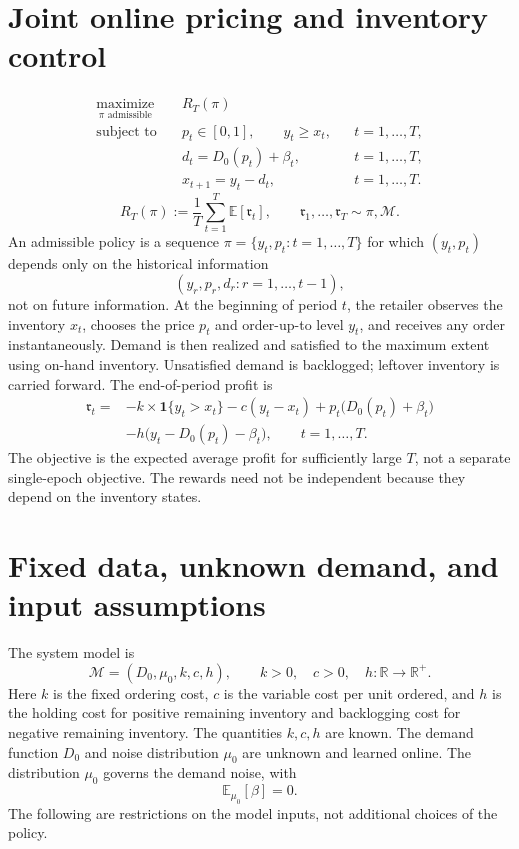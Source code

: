 \documentclass[11pt]{article}
\begin{document}
\section*{Joint online pricing and inventory control}

\begin{equation*}
\begin{aligned}
\underset{\pi\text{ admissible}}{\operatorname{maximize}}\quad &R_T(\pi)\\
\text{subject to}\quad
&p_t\in[0,1],\qquad y_t\geq x_t, &&t=1,\ldots,T,\\
&d_t=D_0(p_t)+\beta_t, &&t=1,\ldots,T,\\
&x_{t+1}=y_t-d_t, &&t=1,\ldots,T.
\end{aligned}
\end{equation*}
\begin{equation}
R_T(\pi):=\frac{1}{T}\sum_{t=1}^{T}\mathbb{E}[\mathfrak{r}_t],
\qquad \mathfrak{r}_1,\ldots,\mathfrak{r}_T\sim\pi,\mathcal{M}.
\tag{2}
\end{equation}
An admissible policy is a sequence
\(\pi=\{y_t,p_t:t=1,\ldots,T\}\) for which \((y_t,p_t)\) depends only on the historical information
\[
(y_r,p_r,d_r:r=1,\ldots,t-1),
\]
not on future information. At the beginning of period \(t\), the retailer observes the inventory \(x_t\), chooses the price \(p_t\) and order-up-to level \(y_t\), and receives any order instantaneously. Demand is then realized and satisfied to the maximum extent using on-hand inventory. Unsatisfied demand is backlogged; leftover inventory is carried forward. The end-of-period profit is
\begin{equation}
\begin{aligned}
\mathfrak{r}_t={}&-k\times\mathbf{1}\{y_t>x_t\}-c(y_t-x_t)
+p_t\bigl(D_0(p_t)+\beta_t\bigr)\\
&-h\bigl(y_t-D_0(p_t)-\beta_t\bigr),
\qquad t=1,\ldots,T.
\end{aligned}
\tag{1}
\end{equation}
The objective is the expected average profit for sufficiently large \(T\), not a separate single-epoch objective. The rewards need not be independent because they depend on the inventory states.

\section*{Fixed data, unknown demand, and input assumptions}
The system model is
\[
\mathcal{M}=(D_0,\mu_0,k,c,h),\qquad
k>0,\quad c>0,\quad h:\mathbb{R}\longrightarrow\mathbb{R}^{+}.
\]
Here \(k\) is the fixed ordering cost, \(c\) is the variable cost per unit ordered, and \(h\) is the holding cost for positive remaining inventory and backlogging cost for negative remaining inventory. The quantities \(k,c,h\) are known. The demand function \(D_0\) and noise distribution \(\mu_0\) are unknown and learned online. The distribution \(\mu_0\) governs the demand noise, with
\[
\mathbb{E}_{\mu_0}[\beta]=0.
\]
The following are restrictions on the model inputs, not additional choices of the policy.
\end{document}
